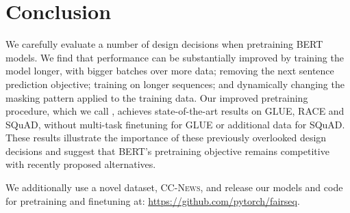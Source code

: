 \section{Conclusion} \label{sec:conclusion}

We carefully evaluate a number of design decisions when pretraining BERT models.
We find that performance can be substantially improved by training the model longer, with bigger batches over more data; removing the next sentence prediction objective; training on longer sequences; and dynamically changing the masking pattern applied to the training data.
Our improved pretraining procedure, which we call \ourmodel{}, achieves state-of-the-art results on GLUE, RACE and SQuAD, without multi-task finetuning for GLUE or additional data for SQuAD.
These results illustrate the importance of these previously overlooked design decisions and suggest that BERT's pretraining objective remains competitive with recently proposed alternatives.

We additionally use a novel dataset, \textsc{CC-News}, and release our models and code for pretraining and finetuning at: \url{https://github.com/pytorch/fairseq}.